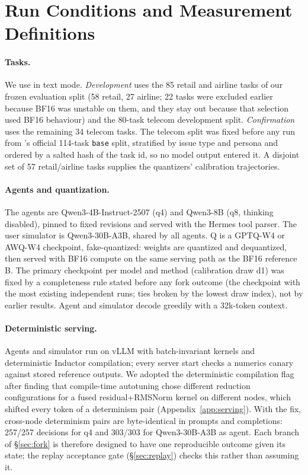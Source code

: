 \section{Run Conditions and Measurement Definitions}
\label{sec:conditions}

\paragraph{Tasks.} We use \tautwo{} \citep{barres2025tau2} in text mode. \emph{Development} uses the 85 retail and airline tasks of our frozen evaluation split (58 retail, 27 airline; 22 tasks were excluded earlier because BF16 was unstable on them, and they stay out because that selection used BF16 behaviour) and the 80-task telecom development split. \emph{Confirmation} uses the remaining 34 telecom tasks. The telecom split was fixed before any run from \tautwo{}'s official 114-task \texttt{base} split, stratified by issue type and persona and ordered by a salted hash of the task id, so no model output entered it. A disjoint set of 57 retail/airline tasks supplies the quantizers' calibration trajectories.

\paragraph{Agents and quantization.} The agents are Qwen3-4B-Instruct-2507 (q4) and Qwen3-8B (q8, thinking disabled), pinned to fixed revisions and served with the Hermes tool parser. The user simulator is Qwen3-30B-A3B, shared by all agents. Q is a GPTQ-W4 \citep{frantar2023gptq} or AWQ-W4 \citep{lin2024awq} checkpoint, fake-quantized: weights are quantized and dequantized, then served with BF16 compute on the same serving path as the BF16 reference B. The primary checkpoint per model and method (calibration draw d1) was fixed by a completeness rule stated before any fork outcome (the checkpoint with the most existing independent runs; ties broken by the lowest draw index), not by earlier results. Agent and simulator decode greedily with a 32k-token context.

\paragraph{Deterministic serving.} Agents and simulator run on vLLM with batch-invariant kernels and deterministic Inductor compilation; every server start checks a numerics canary against stored reference outputs. We adopted the deterministic compilation flag after finding that compile-time autotuning chose different reduction configurations for a fused residual+RMSNorm kernel on different nodes, which shifted every token of a determinism pair (Appendix~\ref{app:serving}). With the fix, cross-node determinism pairs are byte-identical in prompts and completions: 257/257 decisions for q4 and 303/303 for Qwen3-30B-A3B as agent. Each branch of \S\ref{sec:fork} is therefore designed to have one reproducible outcome given its state; the replay acceptance gate (\S\ref{sec:replay}) checks this rather than assuming it.

